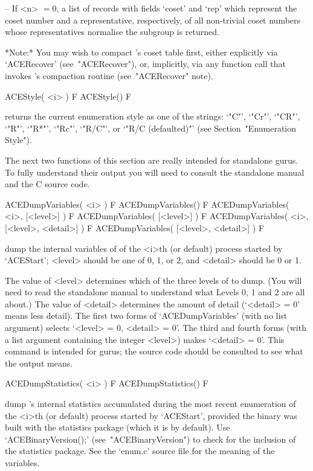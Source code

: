 \item{--} If <n> $= 0$, a list of  records  with  fields  `coset'  and
`rep'  which  represent  the  coset  number  and   a   representative,
respectively, of all non-trivial coset numbers  whose  representatives
normalise the subgroup is returned.

\endlist

*Note:*
You may wish to compact {\ACE}'s coset table first, either  explicitly
via `ACERecover' (see~"ACERecover"), or, implicitly, via any  function
call that invokes {\ACE}'s compaction routine (see~"ACERecover" note).

\>ACEStyle( <i> ) F
\>ACEStyle() F

returns the current enumeration style as one of  the  strings:  `"C"',
`"Cr"', `"CR"', `"R"', `"R*"', `"Rc"', `"R/C"', or `"R/C (defaulted)"'
(see Section~"Enumeration Style").

The next two functions of this section are really intended for  {\ACE}
standalone gurus. To fully understand their output you  will  need  to
consult the standalone manual and the C source code.

\>ACEDumpVariables( <i> ) F
\>ACEDumpVariables() F
\>ACEDumpVariables( <i>, [<level>] ) F
\>ACEDumpVariables( [<level>] ) F
\>ACEDumpVariables( <i>, [<level>, <detail>] ) F
\>ACEDumpVariables( [<level>, <detail>] ) F

dump the internal variables  of  {\ACE}  of  the  <i>th  (or  default)
process started by `ACEStart'; <level> should be one of 0,  1,  or  2,
and <detail> should be 0 or 1.

The value of <level> determines which of the three levels of {\ACE} to
dump. (You will need to read the standalone manual to understand  what
Levels 0, 1 and 2 are all about.) The value of <detail> determines the
amount of detail (`<detail> = 0' means less  detail).  The  first  two
forms of `ACEDumpVariables' (with no list argument) selects `<level> =
0, <detail> = 0'. The third and fourth forms  (with  a  list  argument
containing the integer <level>) makes `<detail> = 0'. This command  is
intended for gurus; the source code should be consulted  to  see  what
the output means.

\>ACEDumpStatistics( <i> ) F
\>ACEDumpStatistics() F

dump {\ACE}'s internal statistics accumulated during the  most  recent
enumeration of the <i>th (or default) process started  by  `ACEStart',
provided the {\ACE} binary  was  built  with  the  statistics  package
(which    it    is    by    default).    Use     `ACEBinaryVersion();'
(see~"ACEBinaryVersion") to check for the inclusion of the  statistics
package.  See  the  `enum.c'  source  file  for  the  meaning  of  the
variables.

